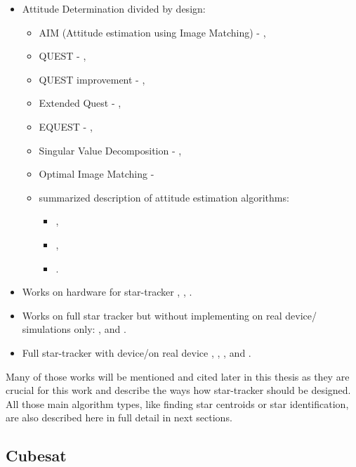 \documentclass[12pt,a4paper,oneside]{article}
\begin{document}
\begin{itemize}[noitemsep]
\item Attitude Determination divided by design: 
\begin{itemize}[noitemsep]
\item AIM (Attitude estimation using Image Matching) - \citet{delabie2012highly}, 
\item QUEST - \citet{shuster1990kalman}, 
\item QUEST improvement - \citet{cheng2014improvement}, 
\item Extended Quest - \citet{psiaki1999extended}, 
\item EQUEST - \citet{rinnan2012development}, 
\item Singular Value Decomposition - \citet{juang2003efficient}, 
\item Optimal Image Matching - \citet{delabie2012highly}
\item summarized description of attitude estimation algorithms: 
\begin{itemize}[noitemsep]
\item \citet{markley1999estimate},
\item \citet{hall2003spacecraft},
\item \citet{tappe2009development}.
\end{itemize}
\end{itemize}

\item Works on hardware for star-tracker \citet{azizabadi2014vlsi}, \citet{gaska2016obc}, \citet{felikson2011orbit}.

\item Works on full star tracker but without implementing on real device/ simulations only: \citet{kandiyil2010attitude}, \citet{huffman2006designing} and \citet{diaz2006performance}.

\item Full star-tracker with device/on real device \citet{jalabert2011optimization}, \citet{lizy2010str}, \citet{rose2003star}, \citet{mortari2002starnav} and
\citet{cannata2007autonomous}.

\end{itemize}

Many of those works will be mentioned and cited later in this thesis as they are crucial for this work and describe the ways how star-tracker should be designed. All those main algorithm types, like finding star centroids or star identification, are also described here in full detail in next sections.

\subsection{Cubesat}
\end{document}
